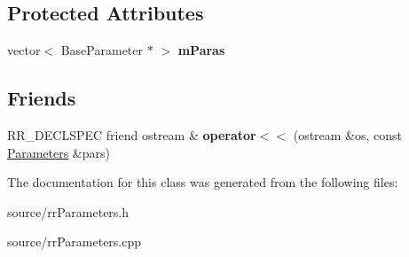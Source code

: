 \subsection*{Protected Attributes}
\begin{DoxyCompactItemize}
\item 
\hypertarget{classrr_1_1_parameters_ae675ab525f4ce33b7e466c24d9bdd728}{vector$<$ Base\-Parameter $\ast$ $>$ {\bfseries m\-Paras}}\label{classrr_1_1_parameters_ae675ab525f4ce33b7e466c24d9bdd728}

\end{DoxyCompactItemize}
\subsection*{Friends}
\begin{DoxyCompactItemize}
\item 
\hypertarget{classrr_1_1_parameters_a8549c7f515868dca16d889ca788bc01f}{R\-R\-\_\-\-D\-E\-C\-L\-S\-P\-E\-C friend ostream \& {\bfseries operator$<$$<$} (ostream \&os, const \hyperlink{classrr_1_1_parameters}{Parameters} \&pars)}\label{classrr_1_1_parameters_a8549c7f515868dca16d889ca788bc01f}

\end{DoxyCompactItemize}


The documentation for this class was generated from the following files\-:\begin{DoxyCompactItemize}
\item 
source/rr\-Parameters.\-h\item 
source/rr\-Parameters.\-cpp\end{DoxyCompactItemize}
